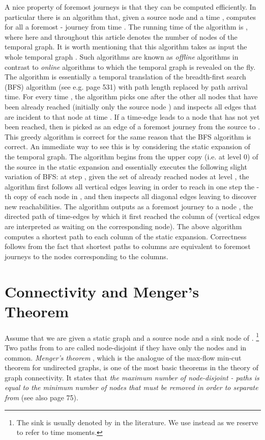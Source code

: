 \documentclass[oribibl, 11pt]{llncs}
\begin{document}
A nice property of foremost journeys is that they can be computed efficiently. In particular there is an algorithm that, given a source node  and a time , computes for all  a foremost - journey from time  \cite{MMCS13,MMS15}. The running time of the algorithm is , where  here and throughout this article denotes the number of nodes of the temporal graph. It is worth mentioning that this algorithm takes as input the whole temporal graph . Such algorithms are known as \emph{offline} algorithms in contrast to \emph{online} algorithms to which the temporal graph is revealed on the fly. The algorithm is essentially a temporal translation of the breadth-first search (BFS) algorithm (see e.g. \cite{CLRS01} page 531) with path length replaced by path arrival time. For every time , the algorithm picks one after the other all nodes that have been already reached (initially only the source node ) and inspects all edges that are incident to that node at time . If a time-edge  leads to a node  that has not yet been reached, then  is picked as an edge of a foremost journey from the source to . This greedy algorithm is correct for the same reason that the BFS algorithm is correct. An immediate way to see this is by considering the static expansion of the temporal graph. The algorithm begins from the upper copy (i.e. at level 0) of the source in the static expansion and essentially executes the following slight variation of BFS: at step , given the set  of already reached nodes at level , the algorithm first follows all vertical edges leaving  in order to reach in one step the -th copy of each node in , and then inspects all diagonal edges leaving  to discover new reachabilities. The algorithm outputs as a foremost journey to a node , the directed path of time-edges by which it first reached the column of  (vertical edges are interpreted as waiting on the corresponding node). The above algorithm computes a shortest path to each column of the static expansion. Correctness follows from the fact that shortest paths to columns are equivalent to foremost journeys to the nodes corresponding to the columns.

\section{Connectivity and Menger's Theorem}
\label{sec:menger}

Assume that we are given a static graph  and a source node  and a sink node  of . \footnote{The sink is usually denoted by  in the literature. We use  instead as we reserve  to refer to time moments.} Two paths from  to  are called node-disjoint if they have only the nodes  and  in common. \emph{Menger's theorem} \cite{Me27}, which is the analogue of the max-flow min-cut theorem for undirected graphs, is one of the most basic theorems in the theory of graph connectivity. It states that \emph{the maximum number of node-disjoint - paths is equal to the minimum number of nodes that must be removed in order to separate  from } (see also \cite{Bo98} page 75). 
\end{document}
